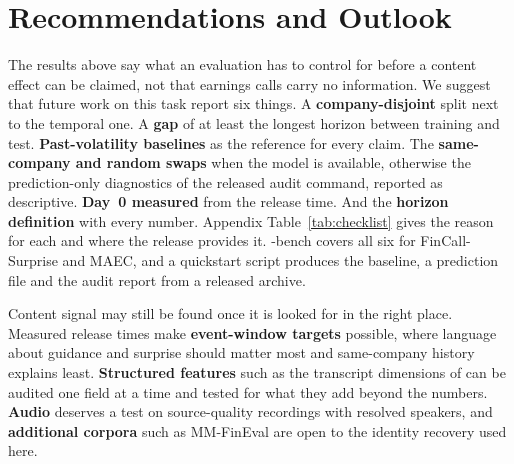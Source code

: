 \section{Recommendations and Outlook}
\label{sec:recommendations}

The results above say what an evaluation has to control for before a content
effect can be claimed, not that earnings calls carry no information. We suggest
that future work on this task report six things. A \textbf{company-disjoint}
split next to the temporal one. A \textbf{gap} of at least the longest horizon
between training and test. \textbf{Past-volatility baselines} as the reference
for every claim. The \textbf{same-company and random swaps} when the model is available,
otherwise the prediction-only diagnostics of the released audit command,
reported as descriptive. \textbf{Day~0 measured} from the release time. And the
\textbf{horizon definition} with every number. Appendix Table~\ref{tab:checklist}
gives the reason for each and where the release provides it. \ecvol-bench covers
all six for FinCall-Surprise and MAEC, and a quickstart script produces the
baseline, a prediction file and the audit report from a released archive.

Content signal may still be found once it is looked for in the right place.
Measured release times make \textbf{event-window targets} possible, where
language about guidance and surprise should matter most and same-company history
explains least. \textbf{Structured features} such as the transcript dimensions of
\citet{fastnumbers2026} can be audited one field at a time and tested for what
they add beyond the numbers. \textbf{Audio} deserves a
test on source-quality recordings with resolved speakers, and \textbf{additional
corpora} such as MM-FinEval \citep{mmfineval2026} are open to the identity
recovery used here.
